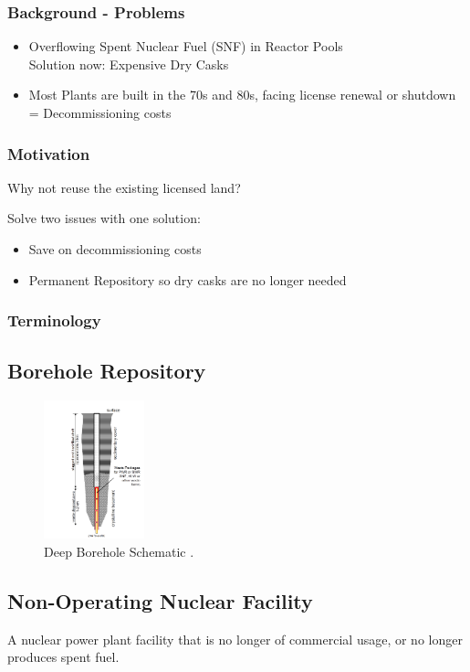 \begin{frame}
	\frametitle{Background - Problems}
	\begin{itemize}
		\item Overflowing Spent Nuclear Fuel (SNF) in Reactor Pools\\
		Solution now: Expensive Dry Casks\\
		\item Most Plants are built in the 70s and 80s, facing license renewal or shutdown
		= Decommissioning costs
	\end{itemize}
\end{frame}

\begin{frame}
	\frametitle{Motivation}
	Why not reuse the existing licensed land?
	
	Solve two issues with one solution:
	\begin{itemize}
		\item Save on decommissioning costs
		\item Permanent Repository so dry casks are no longer needed
	\end{itemize}
\end{frame}

\begin{frame}
	\frametitle{Terminology}
	\subsection{Borehole Repository}
		\begin{figure}[htbp!]
			\begin{center}
				\includegraphics[height=4cm]{./images/borehole_schematic}
			\end{center}
			\caption{Deep Borehole Schematic \cite{brady_deep_2009}.}
			\label{fig:borehole_schematic}
		\end{figure}
	\subsection{Non-Operating Nuclear Facility}
	A nuclear power plant facility that is no longer of commercial usage,
	or no longer produces spent fuel.
\end{frame}
